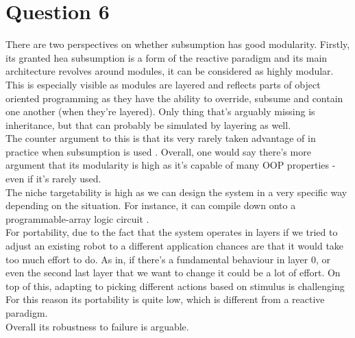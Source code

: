 \documentclass{article}
\newcommand\tab[1][1cm]{\hspace*{#1}}
\begin{document}
\section*{Question 6}
There are two perspectives on whether subsumption has good modularity.
Firstly, its granted hea  subsumption is a form of the reactive 
paradigm and its main architecture revolves around modules, 
it can be considered as highly modular. This is especially visible as 
modules are layered and reflects parts of object oriented programming as 
they have the ability to override, 
subsume and contain one another (when they're layered). 
Only thing that's arguably missing is inheritance, but 
that can probably be simulated by layering as well. \\
\tab The counter argument to this is that its very rarely
taken advantage of in practice when subsumption is used \cite{FangTang}. 
Overall, one would say there's more argument that its modularity is high as
it's capable of many OOP properties - even if it's rarely used.
\\
\tab 
The niche targetability is high as we can design the system in a very specific way depending on the situation.
For instance, it can compile down onto a programmable-array logic circuit \cite{FangTang}.
\\
\tab For portability, due to the fact that the system operates in layers 
if we tried to adjust an existing robot to a different application
chances are that it would take too much effort to do. As in, if 
there's a fundamental behaviour in layer 0, or even
the second last layer that we want to change it could be a lot 
of effort. On top of this, adapting to picking
different actions based on stimulus is challenging
For this reason its portability is quite low, which 
is different from a reactive paradigm. \cite{IntroToAI} \\
\tab Overall its robustness to failure is arguable. 
\end{document}
